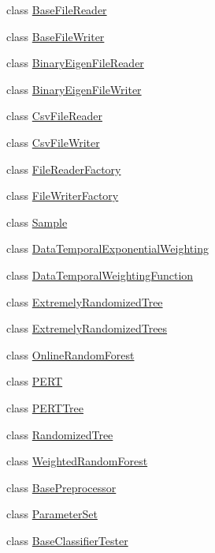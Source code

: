 \begin{DoxyCompactItemize}
\item 
class \hyperlink{classffactory_1_1_base_file_reader}{Base\-File\-Reader}
\item 
class \hyperlink{classffactory_1_1_base_file_writer}{Base\-File\-Writer}
\item 
class \hyperlink{classffactory_1_1_binary_eigen_file_reader}{Binary\-Eigen\-File\-Reader}
\item 
class \hyperlink{classffactory_1_1_binary_eigen_file_writer}{Binary\-Eigen\-File\-Writer}
\item 
class \hyperlink{classffactory_1_1_csv_file_reader}{Csv\-File\-Reader}
\item 
class \hyperlink{classffactory_1_1_csv_file_writer}{Csv\-File\-Writer}
\item 
class \hyperlink{classffactory_1_1_file_reader_factory}{File\-Reader\-Factory}
\item 
class \hyperlink{classffactory_1_1_file_writer_factory}{File\-Writer\-Factory}
\item 
class \hyperlink{classffactory_1_1_sample}{Sample}
\item 
class \hyperlink{classffactory_1_1_data_temporal_exponential_weighting}{Data\-Temporal\-Exponential\-Weighting}
\item 
class \hyperlink{classffactory_1_1_data_temporal_weighting_function}{Data\-Temporal\-Weighting\-Function}
\item 
class \hyperlink{classffactory_1_1_extremely_randomized_tree}{Extremely\-Randomized\-Tree}
\item 
class \hyperlink{classffactory_1_1_extremely_randomized_trees}{Extremely\-Randomized\-Trees}
\item 
class \hyperlink{classffactory_1_1_online_random_forest}{Online\-Random\-Forest}
\item 
class \hyperlink{classffactory_1_1_p_e_r_t}{P\-E\-R\-T}
\item 
class \hyperlink{classffactory_1_1_p_e_r_t_tree}{P\-E\-R\-T\-Tree}
\item 
class \hyperlink{classffactory_1_1_randomized_tree}{Randomized\-Tree}
\item 
class \hyperlink{classffactory_1_1_weighted_random_forest}{Weighted\-Random\-Forest}
\item 
class \hyperlink{classffactory_1_1_base_preprocessor}{Base\-Preprocessor}
\item 
class \hyperlink{classffactory_1_1_parameter_set}{Parameter\-Set}
\item 
class \hyperlink{classffactory_1_1_base_classifier_tester}{Base\-Classifier\-Tester}

\end{DoxyCompactItemize}
